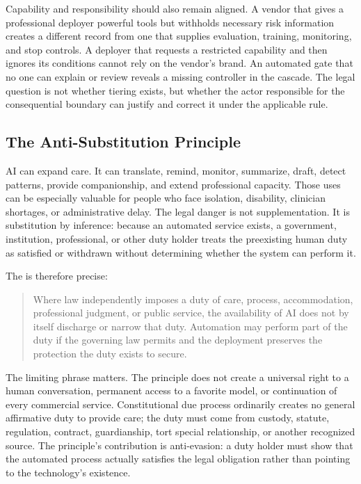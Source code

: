 Capability and responsibility should also remain aligned. A vendor that gives a professional deployer powerful tools but withholds necessary risk information creates a different record from one that supplies evaluation, training, monitoring, and stop controls. A deployer that requests a restricted capability and then ignores its conditions cannot rely on the vendor's brand. An automated gate that no one can explain or review reveals a missing controller in the cascade. The legal question is not whether tiering exists, but whether the actor responsible for the consequential boundary can justify and correct it under the applicable rule.

\subsection{The Anti-Substitution Principle}

AI can expand care. It can translate, remind, monitor, summarize, draft, detect patterns, provide companionship, and extend professional capacity. Those uses can be especially valuable for people who face isolation, disability, clinician shortages, or administrative delay. The legal danger is not supplementation. It is substitution by inference: because an automated service exists, a government, institution, professional, or other duty holder treats the preexisting human duty as satisfied or withdrawn without determining whether the system can perform it.

The  is therefore precise:

\begin{quote}
Where law independently imposes a duty of care, process, accommodation, professional judgment, or public service, the availability of AI does not by itself discharge or narrow that duty. Automation may perform part of the duty if the governing law permits and the deployment preserves the protection the duty exists to secure.
\end{quote}

The limiting phrase matters. The principle does not create a universal right to a human conversation, permanent access to a favorite model, or continuation of every commercial service. Constitutional due process ordinarily creates no general affirmative duty to provide care; the duty must come from custody, statute, regulation, contract, guardianship, tort special relationship, or another recognized source. The principle's contribution is anti-evasion: a duty holder must show that the automated process actually satisfies the legal obligation rather than pointing to the technology's existence.


